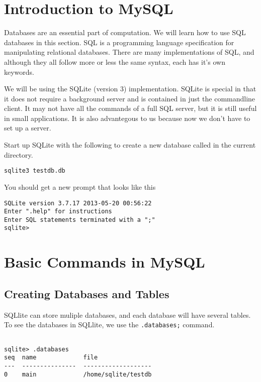 \label{lab:DbEssentials}

\section*{Introduction to MySQL}

Databases are an essential part of computation.  We will learn how to use SQL databases in this section.  SQL is a programming language specification for manipulating relational databases. There are many implementations of SQL, and although they all follow more or less the same syntax, each has it's own keywords.

We will be using the SQLite (version 3) implementation. SQLite is special in that it does not require a background server and is contained in just the commandline client. It may not have all the commands of a full SQL server, but it is still useful in small applications. It is also advantegous to us because now we don't have to set up a server.

Start up SQLite with the following to create a new database called  in the current directory.

\begin{lstlisting}[style=ShellInput]
sqlite3 testdb.db
\end{lstlisting}

You should get a new prompt that looks like this

\begin{lstlisting}
SQLite version 3.7.17 2013-05-20 00:56:22
Enter ".help" for instructions
Enter SQL statements terminated with a ";"
sqlite> 

\end{lstlisting}

\section*{Basic Commands in MySQL}

\subsection{Creating Databases and Tables}

SQLlite can store muliple databases, and each database will have several tables.  To see the databases in SQLlite, we use the {\tt .databases;} command.

\begin{lstlisting}

sqlite> .databases
seq  name             file                                                      
---  ---------------  -------------------
0    main             /home/sqlite/testdb

\end{lstlisting}

